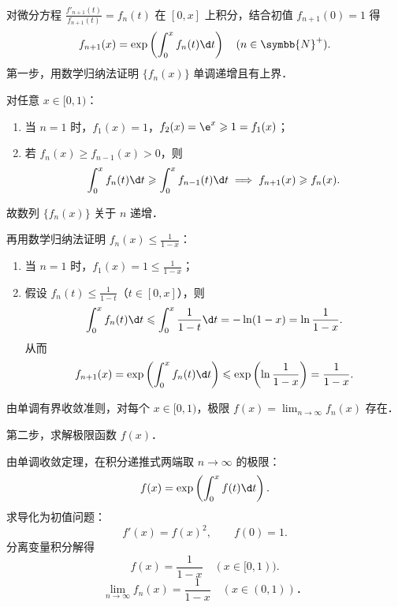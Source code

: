 \begin{solution}
    对微分方程 $\frac{f'_{n+1}(t)}{f_{n+1}(t)} = f_n(t)$ 在 $[0, x]$ 上积分，结合初值 $f_{n+1}(0) = 1$ 得
    \begin{equation}
        f_{n+1}(x) = \exp\left( \int_0^x f_n(t)\d t \right) \quad (n \in \symbb{N}^+).
    \end{equation}
    第一步，用数学归纳法证明 $\{f_n(x)\}$ 单调递增且有上界．

    对任意 $x \in [0, 1)$：
    \begin{enumerate}
        \item 当 $n = 1$ 时，$f_1(x) = 1$，$f_2(x) = \e^x \geqslant 1 = f_1(x)$；
        \item 若 $f_n(x) \geqslant f_{n-1}(x) > 0$，则
              \begin{equation}
                  \int_0^x f_n(t)\d t \geqslant \int_0^x f_{n-1}(t)\d t \implies f_{n+1}(x) \geqslant f_n(x).
              \end{equation}
    \end{enumerate}
    故数列 $\{f_n(x)\}$ 关于 $n$ 递增．

    再用数学归纳法证明 $f_n(x) \leqslant \frac{1}{1 - x}$：
    \begin{enumerate}
        \item 当 $n = 1$ 时，$f_1(x) = 1 \leqslant \frac{1}{1 - x}$；
        \item 假设 $f_n(t) \leqslant \frac{1}{1 - t}$（$t \in [0, x]$），则
              \begin{equation}
                  \int_0^x f_n(t)\d t \leqslant \int_0^x \frac{1}{1 - t}\d t = -\ln(1 - x) = \ln\frac{1}{1 - x}.
              \end{equation}
              从而
              \begin{equation}
                  f_{n+1}(x) = \exp\left( \int_0^x f_n(t)\d t \right) \leqslant \exp\left( \ln\frac{1}{1 - x} \right) = \frac{1}{1 - x}.
              \end{equation}
    \end{enumerate}
    由单调有界收敛准则，对每个 $x \in [0, 1)$，极限 $f(x) = \lim_{n\to\infty} f_n(x)$ 存在．

    第二步，求解极限函数 $f(x)$．

    由单调收敛定理，在积分递推式两端取 $n \to \infty$ 的极限：
    \begin{equation}
        f(x) = \exp\left( \int_0^x f(t)\d t \right).
    \end{equation}
    求导化为初值问题：
    \begin{equation}
        f'(x) = f(x)^2, \qquad f(0) = 1.
    \end{equation}
    分离变量积分解得
    \begin{equation}
        f(x) = \frac{1}{1 - x} \quad (x \in [0, 1)).
    \end{equation}
    \begin{equation}
        \boxed{\lim_{n\to\infty} f_n(x) = \frac{1}{1 - x} \quad (x \in (0, 1))．}
    \end{equation}
\end{solution}

